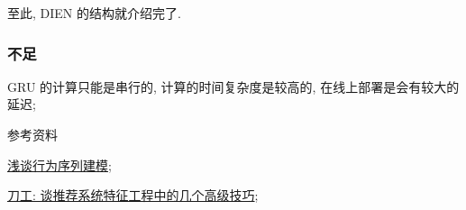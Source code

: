 至此, DIEN 的结构就介绍完了.

\subsubsection{不足}
\begin{myitemize}
	\item GRU 的计算只能是串行的, 计算的时间复杂度是较高的, 在线上部署是会有较大的延迟;
\end{myitemize}


参考资料
\begin{myitemize}
	\item \href{https://mp.weixin.qq.com/s?__biz=MzU0MDA1MzI0Mw==&mid=2247488129&idx=1&sn=ed882611a06b75e8e819b519010e9e81&chksm=fb3e4915cc49c003cb4505d0b09f06fa1c4e92409270b49f5509f1902774234382ba05b400d8&scene=21#wechat_redirect}{浅谈行为序列建模};
	
	\item \href{https://mp.weixin.qq.com/s?__biz=MzI5NTU2ODQzMg==&mid=2247484150&idx=1&sn=3bdb017a542bc2e2b94404f46ec9eb4f&chksm=ec50d7a9db275ebfdc009e6be3ea6a0ee8209477dafc99bc8a6a212fa0456a14bf4453b826dd&scene=21#wechat_redirect}{刀工: 谈推荐系统特征工程中的几个高级技巧};
\end{myitemize}